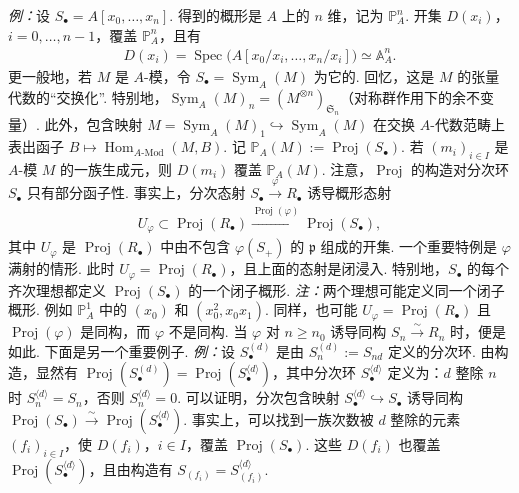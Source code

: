 \begin{numpara}
\emph{例：}设 $S_\bullet=A[x_0,\ldots,x_n]$. 得到的概形是 $A$ 上的 $n$ 维，记为 $\mathbb P_A^n$. 开集 $D(x_i)$，$i=0,\ldots,n-1$，覆盖 $\mathbb P_A^n$，且有
\begin{align*}
D(x_i)=\operatorname{Spec}\bigl(A[x_0/x_i,\ldots,x_n/x_i]\bigr)\simeq\mathbb A_A^n.
\end{align*}
更一般地，若 $M$ 是 $A$-模，令 $S_\bullet=\operatorname{Sym}_A(M)$ 为它的. 回忆，这是 $M$ 的张量代数的``交换化''. 特别地，$\operatorname{Sym}_A(M)_n=(M^{\otimes n})_{\mathfrak S_n}$（对称群作用下的余不变量）. 此外，包含映射 $M=\operatorname{Sym}_A(M)_1\hookrightarrow\operatorname{Sym}_A(M)$ 在交换 $A$-代数范畴上表出函子 $B\mapsto\operatorname{Hom}_{A\text{-}\mathrm{Mod}}(M,B)$. 记 $\mathbb P_A(M):=\operatorname{Proj}(S_\bullet)$. 若 $(m_i)_{i\in I}$ 是 $A$-模 $M$ 的一族生成元，则 $D(m_i)$ 覆盖 $\mathbb P_A(M)$.
注意，$\operatorname{Proj}$ 的构造对分次环 $S_\bullet$ 只有部分函子性. 事实上，分次态射 $S_\bullet\xrightarrow\varphi R_\bullet$ 诱导概形态射
\begin{align*}
U_\varphi\subset\operatorname{Proj}(R_\bullet)\xrightarrow{\operatorname{Proj}(\varphi)}\operatorname{Proj}(S_\bullet),
\end{align*}
其中 $U_\varphi$ 是 $\operatorname{Proj}(R_\bullet)$ 中由不包含 $\varphi(S_+)$ 的 $\mathfrak p$ 组成的开集. 一个重要特例是 $\varphi$ 满射的情形. 此时 $U_\varphi=\operatorname{Proj}(R_\bullet)$，且上面的态射是闭浸入. 特别地，$S_\bullet$ 的每个齐次理想都定义 $\operatorname{Proj}(S_\bullet)$ 的一个闭子概形.
\emph{注：}两个理想可能定义同一个闭子概形. 例如 $\mathbb P_A^1$ 中的 $(x_0)$ 和 $(x_0^2,x_0x_1)$. 同样，也可能 $U_\varphi=\operatorname{Proj}(R_\bullet)$ 且 $\operatorname{Proj}(\varphi)$ 是同构，而 $\varphi$ 不是同构. 当 $\varphi$ 对 $n\geqslant n_0$ 诱导同构 $S_n\xrightarrow\sim R_n$ 时，便是如此. 下面是另一个重要例子.
\emph{例：}设 $S_\bullet^{(d)}$ 是由 $S_n^{(d)}:=S_{nd}$ 定义的分次环. 由构造，显然有 $\operatorname{Proj}(S_\bullet^{(d)})=\operatorname{Proj}(S_\bullet^{\langle d\rangle})$，其中分次环 $S_\bullet^{\langle d\rangle}$ 定义为：$d$ 整除 $n$ 时 $S_n^{\langle d\rangle}=S_n$，否则 $S_n^{\langle d\rangle}=0$. 可以证明，分次包含映射 $S_\bullet^{\langle d\rangle}\hookrightarrow S_\bullet$ 诱导同构 $\operatorname{Proj}(S_\bullet)\xrightarrow\sim\operatorname{Proj}(S_\bullet^{\langle d\rangle})$. 事实上，可以找到一族次数被 $d$ 整除的元素 $(f_i)_{i\in I}$，使 $D(f_i)$，$i\in I$，覆盖 $\operatorname{Proj}(S_\bullet)$. 这些 $D(f_i)$ 也覆盖 $\operatorname{Proj}(S_\bullet^{\langle d\rangle})$，且由构造有 $S_{(f_i)}=S_{(f_i)}^{\langle d\rangle}$.

\end{numpara}
